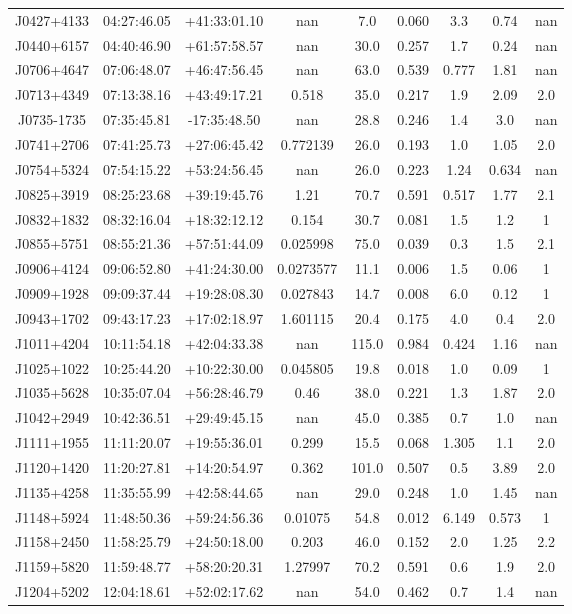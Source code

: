 \begin{table}[H]
\begin{tabular}{@{}ccccccccc@{}}
        J0427+4133 & 04:27:46.05 & +41:33:01.10 & nan & 7.0 & 0.060 & 3.3 & 0.74 & nan \\
        J0440+6157 & 04:40:46.90 & +61:57:58.57 & nan & 30.0 & 0.257 & 1.7 & 0.24 & nan \\
        J0706+4647 & 07:06:48.07 & +46:47:56.45 & nan & 63.0 & 0.539 & 0.777 & 1.81 & nan \\
        J0713+4349 & 07:13:38.16 & +43:49:17.21 & 0.518 & 35.0 & 0.217 & 1.9 & 2.09 & 2.0 \\
        J0735-1735 & 07:35:45.81 & -17:35:48.50 & nan & 28.8 & 0.246 & 1.4 & 3.0 & nan \\
        J0741+2706 & 07:41:25.73 & +27:06:45.42 & 0.772139 & 26.0 & 0.193 & 1.0 & 1.05 & 2.0 \\
        J0754+5324 & 07:54:15.22 & +53:24:56.45 & nan & 26.0 & 0.223 & 1.24 & 0.634 & nan \\
        J0825+3919 & 08:25:23.68 & +39:19:45.76 & 1.21 & 70.7 & 0.591 & 0.517 & 1.77 & 2.1 \\
        J0832+1832 & 08:32:16.04 & +18:32:12.12 & 0.154 & 30.7 & 0.081 & 1.5 & 1.2 & 1 \\
        J0855+5751 & 08:55:21.36 & +57:51:44.09 & 0.025998 & 75.0 & 0.039 & 0.3 & 1.5 & 2.1 \\
        J0906+4124 & 09:06:52.80 & +41:24:30.00 & 0.0273577 & 11.1 & 0.006 & 1.5 & 0.06 & 1 \\
        J0909+1928 & 09:09:37.44 & +19:28:08.30 & 0.027843 & 14.7 & 0.008 & 6.0 & 0.12 & 1 \\
        J0943+1702 & 09:43:17.23 & +17:02:18.97 & 1.601115 & 20.4 & 0.175 & 4.0 & 0.4 & 2.0 \\
        J1011+4204 & 10:11:54.18 & +42:04:33.38 & nan & 115.0 & 0.984 & 0.424 & 1.16 & nan \\
        J1025+1022 & 10:25:44.20 & +10:22:30.00 & 0.045805 & 19.8 & 0.018 & 1.0 & 0.09 & 1 \\
        J1035+5628 & 10:35:07.04 & +56:28:46.79 & 0.46 & 38.0 & 0.221 & 1.3 & 1.87 & 2.0 \\
        J1042+2949 & 10:42:36.51 & +29:49:45.15 & nan & 45.0 & 0.385 & 0.7 & 1.0 & nan \\
        J1111+1955 & 11:11:20.07 & +19:55:36.01 & 0.299 & 15.5 & 0.068 & 1.305 & 1.1 & 2.0 \\
        J1120+1420 & 11:20:27.81 & +14:20:54.97 & 0.362 & 101.0 & 0.507 & 0.5 & 3.89 & 2.0 \\
        J1135+4258 & 11:35:55.99 & +42:58:44.65 & nan & 29.0 & 0.248 & 1.0 & 1.45 & nan \\
        J1148+5924 & 11:48:50.36 & +59:24:56.36 & 0.01075 & 54.8 & 0.012 & 6.149 & 0.573 & 1 \\
        J1158+2450 & 11:58:25.79 & +24:50:18.00 & 0.203 & 46.0 & 0.152 & 2.0 & 1.25 & 2.2 \\
        J1159+5820 & 11:59:48.77 & +58:20:20.31 & 1.27997 & 70.2 & 0.591 & 0.6 & 1.9 & 2.0 \\
        J1204+5202 & 12:04:18.61 & +52:02:17.62 & nan & 54.0 & 0.462 & 0.7 & 1.4 & nan \\


\end{tabular}
\end{table}
